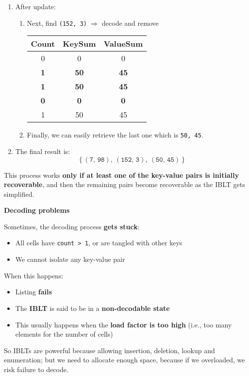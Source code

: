 \begin{enumerate}
    \item After update:
    \begin{enumerate}
        \item Next, find \texttt{(152, 3)} $\Rightarrow$ decode and remove
        \begin{table}[!htp]
            \centering
            \begin{tabular}{@{} c c c @{}}
                \toprule
                Count   & KeySum    & ValueSum  \\
                \midrule
                0       & 0         & 0         \\
                \textbf{1}       & \textbf{50}        & \textbf{45}        \\
                \textbf{1}       & \textbf{50}        & \textbf{45}        \\
                \textbf{0}       & \textbf{0}         & \textbf{0}         \\
                1       & 50        & 45        \\
                \bottomrule
            \end{tabular}
        \end{table}
        \item Finally, we can easily retrieve the last one which is \texttt{50, 45}.
    \end{enumerate}

    \item The final result is:
    \begin{equation*}
        \left\{
            \left(\texttt{7, 98}\right), \: \left(\texttt{152, 3}\right), \: \left(\texttt{50, 45}\right)
        \right\}
    \end{equation*}
\end{enumerate}
This process works \textbf{only if at least one of the key-value pairs is initially recoverable}, and then the remaining pairs become recoverable as the IBLT gets simplified.

\newpage

\begin{flushleft}
    \textcolor{Red2}{ \textbf{Decoding problems}}
\end{flushleft}
Sometimes, the decoding process \textbf{gets stuck}:
\begin{itemize}
    \item All cells have \texttt{count > 1}, or are tangled with other keys
    \item We cannot isolate any key-value pair
\end{itemize}
When this happens:
\begin{itemize}
    \item Listing \textbf{fails}
    \item The \textbf{IBLT} is said to be in a \textbf{non-decodable state}
    \item This usually happens when the \textbf{load factor is too high} (i.e., too many elements for the number of cells)
\end{itemize}
So IBLTs are powerful because allowing insertion, deletion, lookup and enumeration; but we need to allocate enough space, because if we overloaded, we risk failure to decode.

